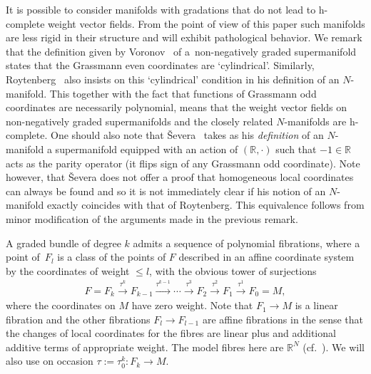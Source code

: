 \documentclass[pdftex]{sigma}
\numberwithin{equation}{section}
\begin{document}
\begin{Remark}
It is possible to consider manifolds with gradations that do not lead to h-complete weight vector f\/ields. From the point of view of this paper such manifolds are less rigid in their structure and will exhibit pathological behavior.  We remark that the def\/inition given by Voronov~\cite{Voronov:2001qf} of a~non-negatively graded supermanifold states that the Grassmann even coordinates are `cylindrical'.  Similarly, Roytenberg~\cite{Roytenberg:2001} also insists on this `cylindrical' condition in his def\/inition of an $N$-manifold.   This together with the fact that functions of Grassmann odd coordinates are necessarily polynomial, means that the weight vector f\/ields on  non-negatively graded supermanifolds and the closely related $N$-manifolds are h-complete. One should also note that \v{S}evera~\cite{Severa:2005} takes as his \emph{definition} of an $N$-manifold a supermanifold equipped with an action of $(\mathbb{R}, \cdot)$ such that $-1  \in \mathbb{R}$ acts as the parity operator (it f\/lips sign of any Grassmann odd coordinate). Note however, that \v{S}evera does not of\/fer a proof that homogeneous local coordinates can always be found and so it is not immediately clear if his notion of an $N$-manifold exactly coincides with that of  Roytenberg. This equivalence follows from minor modif\/ication of the arguments made in the previous remark.
\end{Remark}

A graded bundle  of degree $k$  admits a sequence of  polynomial f\/ibrations, where a point of~$F_{l}$ is a class of the points of $F$ described  in an af\/f\/ine coordinate system by the coordinates of weight $\leq l$, with the obvious tower of  surjections
\begin{gather*}%
F=F_{k} \stackrel{\tau^{k}}{\longrightarrow} F_{k-1} \stackrel{\tau^{k-1}}{\longrightarrow}   \cdots \stackrel{\tau^{3}}{\longrightarrow} F_{2} \stackrel{\tau^{2}}{\longrightarrow}F_{1} \stackrel{\tau^{1}}{\longrightarrow} F_{0} = M,
\end{gather*}
 where the coordinates on $M$ have zero weight. Note that  $F_{1} \rightarrow M$ is a linear f\/ibration and the other f\/ibrations $F_{l} \rightarrow F_{l-1}$ are af\/f\/ine f\/ibrations in the sense that the changes of local coordinates for the f\/ibres are linear plus and additional additive terms of appropriate weight.  The model f\/ibres here are $\mathbb{R}^{N}$ (cf.~\cite{Grabowski2012}).  We will also use on occasion $\tau := \tau^{k}_{0}\colon F_{k} \rightarrow M$.
\end{document}
